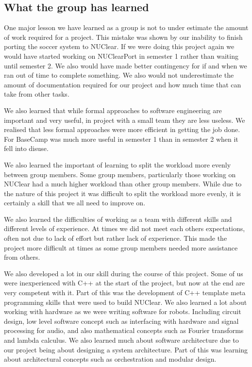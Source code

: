 \documentclass[english,12pt]{scrartcl}
\begin{document}
	\subsection{What the group has learned}
		One major lesson we have learned as a group is not to under estimate the amount of work required for a project.
		This mistake was shown by our inability to finish porting the soccer system to NUClear.
		If we were doing this project again we would have started working on NUClearPort in semester 1 rather than waiting until semester 2.
		We also would have made better contingency for if and when we ran out of time to complete something.
		We also would not underestimate the amount of documentation required for our project and how much time that can take from other tasks.

		We also learned that while formal approaches to software engineering are important and very useful, in project with a small team they are less useless.
		We realised that less formal approaches were more efficient in getting the job done.
		For BaseCamp was much more useful in semester 1 than in semester 2 when it fell into disuse.

		We also learned the important of learning to split the workload more evenly between group members.
		Some group members, particularly those working on NUClear had a much higher workload than other group members.
		While due to the nature of this project it was difficult to split the workload more evenly, it is certainly a skill that we all need to improve on.

		We also learned the difficulties of working as a team with different skills and different levels of experience.
		At times we did not meet each others expectations, often not due to lack of effort but rather lack of experience.
		This made the project more difficult at times as some group members needed more assistance from others.

		We also developed a lot in our skill during the course of this project.
		Some of us were inexperienced with C++ at the start of the project, but now at the end are very competent with it.
		Part of this was the development of C++ template meta programming skills that were used to build NUClear.
		We also learned a lot about working with hardware as we were writing software for robots.
		Including circuit design, low level software concept such as interfacing with hardware and signal processing for audio, and also mathematical concepts such as Fourier transforms and lambda calculus.
		We also learned much about software architecture due to our project being about designing a system architecture.
		Part of this was learning about architectural concepts such as orchestration and modular design.
		
		
\end{document}
